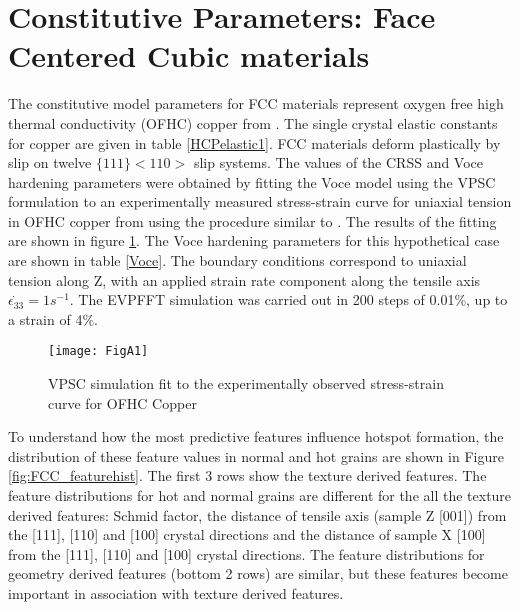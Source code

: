 \documentclass[preprint,1p,times,authoryear]{elsarticle}%
\begin{document}
\appendix
\section{Constitutive Parameters: Face Centered Cubic materials} 
\label{AppendixA} %


The constitutive model parameters for FCC materials represent oxygen free high thermal conductivity (OFHC) copper from \cite{Masi1879}. The single crystal elastic constants for copper are given in table \ref{HCPelastic1}. FCC materials deform plastically by slip on twelve $ \{111\}<110>$ slip systems. The values of the CRSS and Voce hardening parameters were obtained by fitting the Voce model using the VPSC formulation to an experimentally measured stress-strain curve for uniaxial tension in OFHC copper from \cite{Bronkhorst1991} using the procedure similar to \cite{MANDAL201757}. The results of the fitting are shown in figure \ref{fig:VPSCfit}. The Voce hardening parameters for this hypothetical case are shown in table \ref{Voce}. The boundary conditions correspond to uniaxial tension along Z, with an applied strain rate component along the tensile axis $\dot{\epsilon_{33}} = 1s^{-1}$. The EVPFFT simulation was carried out in 200 steps of 0.01\%, up to a strain of 4\%. 

\begin{figure}[!h]
\centering
\texttt{[image: FigA1]}%
\caption{VPSC simulation fit to the experimentally observed stress-strain curve for OFHC Copper}
\label{fig:VPSCfit}
\end{figure}


To understand how the most predictive features influence hotspot formation, the distribution of these feature values in normal and hot grains are shown in Figure \ref{fig:FCC_featurehist}. The first 3 rows show the texture derived features. The feature distributions for hot and normal grains are different for the all the texture derived features: Schmid factor, the distance of tensile axis (sample Z [001]) from the [111], [110] and [100] crystal directions and the distance of sample X [100] from the [111], [110] and [100] crystal directions. The feature distributions for geometry derived features (bottom 2 rows) are similar, but these features become important in association with texture derived features.\vfill  
\end{document}
